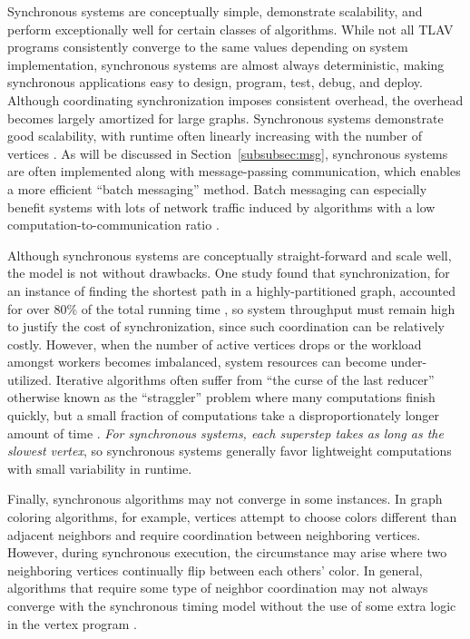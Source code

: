 \documentclass[reprint,twocolumn,showpacs,preprintnumbers,amsmath, aps,pre,amssymb]{revtex4-1}
\begin{document}
Synchronous systems are conceptually simple, demonstrate scalability, and perform exceptionally well for certain classes of algorithms.  While not all TLAV programs consistently converge to the same values depending on system implementation, synchronous systems are almost always deterministic, making synchronous applications easy to design, program, test, debug, and deploy.  Although coordinating synchronization imposes consistent overhead, the overhead becomes largely amortized for large graphs.  Synchronous systems demonstrate good scalability, with runtime often linearly increasing with the number of vertices \cite{Malewicz2010}.  As will be discussed in Section~\ref{subsubsec:msg}, synchronous systems are often implemented along with message-passing communication, which enables a more efficient ``batch messaging'' method. Batch messaging can especially benefit systems with lots of network traffic induced by algorithms with a low computation-to-communication ratio \cite{Xie2013}.

Although synchronous systems are conceptually straight-forward and scale well, the model is not without drawbacks.  One study found that synchronization, for an instance of finding the shortest path in a highly-partitioned graph, accounted for over 80\% of the total running time \cite{Chen}, so system throughput must remain high to justify the cost of synchronization, since such coordination can be relatively costly.  However, when the number of active vertices drops or the workload amongst workers becomes imbalanced, system resources can become under-utilized.   Iterative algorithms often suffer from ``the curse of the last reducer'' otherwise known as the ``straggler'' problem where many computations finish quickly, but a small fraction of computations take a disproportionately longer amount of time \cite{Suri2011}. {\em For synchronous systems, each superstep takes as long as the slowest vertex}, so synchronous systems generally favor lightweight computations with small variability in runtime.

Finally, synchronous algorithms may not converge in some instances.  In graph coloring algorithms, for example, vertices attempt to choose colors different than adjacent neighbors \cite{Gonzalez2011} and require coordination between neighboring vertices. However, during synchronous execution, the circumstance may arise where two neighboring vertices continually flip between each others' color.  In general, algorithms that require some type of neighbor coordination may not always converge with the synchronous timing model without the use of some extra logic in the vertex program \cite{Xie2013}.
\end{document}
